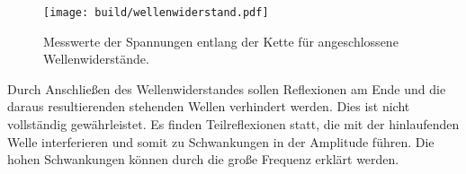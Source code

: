 \begin{figure}
  \centering
  \texttt{[image: build/wellenwiderstand.pdf]}
\caption{Messwerte der Spannungen entlang der Kette für angeschlossene Wellenwiderstände.}
  \label{fig:wellenwiderstand}
\end{figure}

Durch Anschließen des Wellenwiderstandes sollen Reflexionen am Ende und die daraus resultierenden stehenden Wellen verhindert werden. Dies ist nicht vollständig gewährleistet. Es finden Teilreflexionen statt, die mit der hinlaufenden Welle interferieren und somit zu Schwankungen in der Amplitude führen. Die hohen Schwankungen können durch die große Frequenz erklärt werden.
